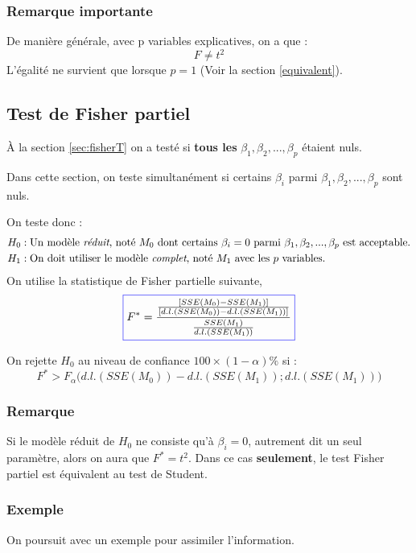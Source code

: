 \documentclass[11pt,french]{report}
\begin{document}
\subsubsection*{Remarque importante}
De manière générale, avec p variables explicatives, on a que :
$$
F \neq t^2
$$
L'égalité ne survient que lorsque $p=1$ (Voir la section \ref{equivalent}).

\subsection{Test de Fisher partiel}
\label{sec:testFpartiel}
À la section \ref{sec:fisherT} on a testé si \textbf{tous les} $\beta_1, \beta_2,...,\beta_p$ étaient nuls. \newline

Dans cette section, on teste simultanément si certains $\beta_i$ parmi $\beta_1, \beta_2,...,\beta_p$ sont nuls.

On teste donc :
\begin{align*}
H_0 &: \text{Un modèle \emph{réduit}, noté $M_0$ dont certains $\beta_i =0$ parmi $\beta_1, \beta_2,...,\beta_p$ est acceptable.} \\
H_1 &: \text{On doit utiliser le modèle \emph{complet}, noté $M_1$ avec les $p$ variables.} \\
\end{align*}
On utilise la statistique de Fisher partielle suivante,
\begin{equation}
\label{eq:fisherpartiel}
\color{blue}
\boxed{\color{black}
F^* = \frac{\frac{[SSE(M_0) - SSE(M_1)]}{[d.l.(SSE(M_0)) - d.l.(SSE(M_1))]}}{\frac{SSE(M_1)}{d.l.(SSE(M_1))}}
}
\end{equation}

On rejette $H_0$ au niveau de confiance $100 \times (1 - \alpha)\%$ si :
$$
F^* > F_{\alpha}\Big( d.l.(SSE(M_0)) - d.l.(SSE(M_1)); d.l.(SSE(M_1)) \Big)
$$

\subsubsection*{Remarque}
Si le modèle réduit de $H_0$ ne consiste qu'à $\beta_i =0$, autrement dit un seul paramètre, alors on aura que $F^* = t^2$. Dans ce cas \textbf{seulement}, le test Fisher partiel est équivalent au test de Student.

\subsubsection*{Exemple}
On poursuit avec un exemple pour assimiler l'information. \newline
\end{document}
